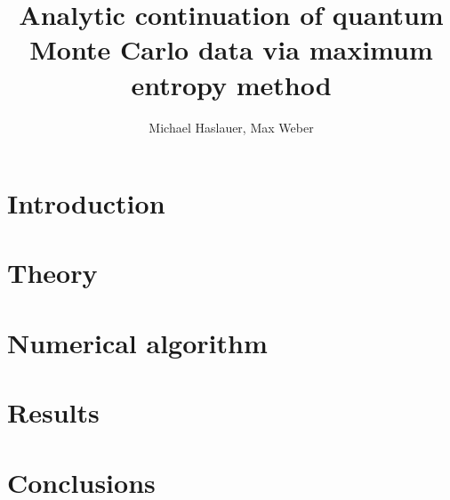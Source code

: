\documentclass[10pt,letterpaper]{article}
\begin{document}
\title{Analytic continuation of quantum Monte Carlo data via maximum entropy method}
\author{Michael Haslauer, Max Weber}

\begin{thebibliography}{99}

\end{thebibliography}
\section{Introduction} %
\label{sec:introduction}

\section{Theory} %
\label{sec:theory}

\section{Numerical algorithm} %
\label{sec:numerical_algorithm}

\section{Results} %
\label{sec:results}

\section{Conclusions} %
\label{sec:conclusions}

\end{document}
